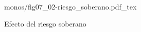\begin{figure}[h]
\centering
\def\svgwidth{0.5\textwidth}
{monos/fig07_02-riesgo_soberano.pdf_tex}
\caption{Efecto del riesgo soberano}
\label{fig07_02-riesgo_soberano}
\end{figure}